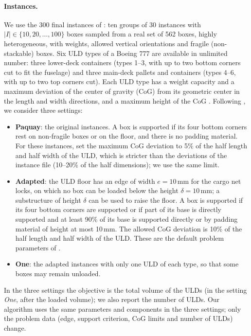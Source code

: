 \paragraph{Instances.}
We use the 300 final instances of \citet{Paquay2018b}: ten groups of 30 instances with
$|I| \in \{10, 20, \dots, 100\}$ boxes sampled from a real set of 562 boxes, highly heterogeneous,
with weights, allowed vertical orientations and fragile (non-stackable) boxes. Six ULD types
of a Boeing 777 are available in unlimited number: three lower-deck containers (types 1--3,
with up to two bottom corners cut to fit the fuselage) and three main-deck pallets and
containers (types 4--6, with up to two top corners cut). Each ULD type has a weight capacity and
a maximum deviation of the center of gravity (CoG) from its geometric center in the length and
width directions, and a maximum height of the CoG \citep{Paquay2016}.
Following \citet{Hessler2025}, we consider three settings:
\begin{itemize}
\item \textbf{Paquay}: the original instances. A box is supported if its four bottom corners
	rest on non-fragile boxes or on the floor, and there is no padding material. For these
	instances, \citet{Hessler2025} set the maximum CoG deviation to 5\% of the half length and
	half width of the ULD, which is stricter than the deviations of the instance file (10--20\% of
	the half dimensions); we use the same limit.
\item \textbf{Adapted}: the ULD floor has an edge of width $e = 10$\,mm for the cargo net locks,
	on which no box can be loaded below the height $\delta = 10$\,mm; a substructure of height
	$\delta$ can be used to raise the floor. A box is supported if its four bottom corners are
	supported or if part of its base is directly supported and at least 90\% of its base is
	supported directly or by padding material of height at most 10\,mm. The allowed CoG
	deviation is 10\% of the half length and half width of the ULD. These are the default
	problem parameters of \citet[Table~2]{Hessler2025}.
\item \textbf{One}: the adapted instances with only one ULD of each type, so that some boxes may
	remain unloaded.
\end{itemize}
In the three settings the objective is the total volume of the ULDs \citep{Paquay2016,Hessler2025}
(in the setting \emph{One}, after the loaded volume); we also report the number of ULDs. Our
algorithm uses the same parameters and components in the three settings; only the problem data
(edge, support criterion, CoG limits and number of ULDs) change.

